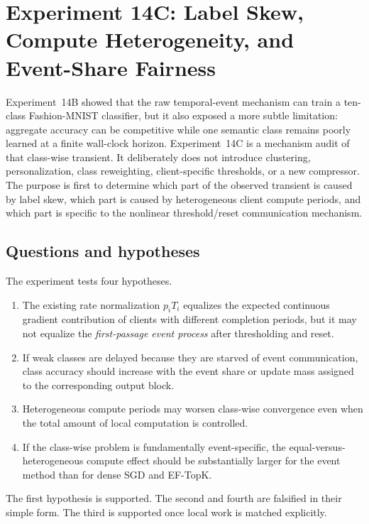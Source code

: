 \section{Experiment 14C: Label Skew, Compute Heterogeneity, and Event-Share Fairness}
\label{sec:exp14c}

Experiment~14B showed that the raw temporal-event mechanism can train a ten-class Fashion-MNIST classifier, but it also exposed a more subtle limitation: aggregate accuracy can be competitive while one semantic class remains poorly learned at a finite wall-clock horizon. Experiment~14C is a mechanism audit of that class-wise transient. It deliberately does not introduce clustering, personalization, class reweighting, client-specific thresholds, or a new compressor. The purpose is first to determine which part of the observed transient is caused by label skew, which part is caused by heterogeneous client compute periods, and which part is specific to the nonlinear threshold/reset communication mechanism.

\subsection{Questions and hypotheses}

The experiment tests four hypotheses.
\begin{enumerate}
    \item The existing rate normalization $p_iT_i$ equalizes the expected continuous gradient contribution of clients with different completion periods, but it may not equalize the \emph{first-passage event process} after thresholding and reset.
    \item If weak classes are delayed because they are starved of event communication, class accuracy should increase with the event share or update mass assigned to the corresponding output block.
    \item Heterogeneous compute periods may worsen class-wise convergence even when the total amount of local computation is controlled.
    \item If the class-wise problem is fundamentally event-specific, the equal-versus-heterogeneous compute effect should be substantially larger for the event method than for dense SGD and EF-TopK.
\end{enumerate}

The first hypothesis is supported. The second and fourth are falsified in their simple form. The third is supported once local work is matched explicitly.

